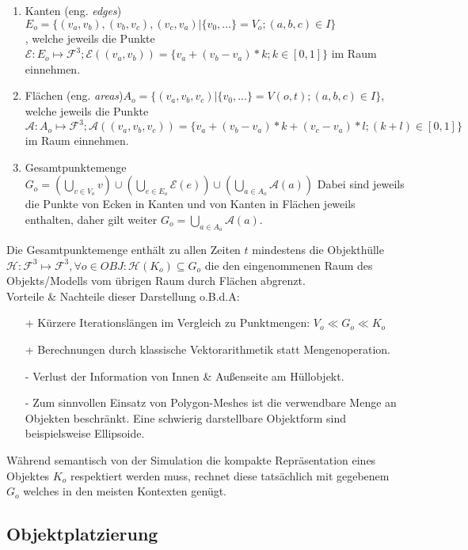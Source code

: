 \begin{enumerate}
\item Kanten (eng. \textit{edges}) $E_o = \{(v_a, v_b), (v_b, v_c),(v_c, v_a) | \{v_0, ...\} = V_o;(a, b, c) \in I\} $\\
, welche jeweils die Punkte $\mathcal{E}:E_o\mapsto\mathcal{F}^3; \mathcal{E}((v_a, v_b)) = \{v_a + (v_b-v_a)* k; k \in [0,1]\} $ im Raum einnehmen.
\item Flächen (eng. \textit{areas})$ A_o = \{(v_a, v_b, v_c) | \{v_0, ... \} = V(o, t); (a, b, c) \in I\} $,\\
welche jeweils die Punkte $\mathcal{A}:A_o\mapsto\mathcal{F}^3; \mathcal{A}((v_a, v_b, v_c)) = \{v_a + (v_b-v_a)* k + (v_c-v_a)*l; (k+l) \in [0,1]\} $ im Raum einnehmen.
\item Gesamtpunktemenge $G_o = (\bigcup_{v\in V_o} v) \cup (\bigcup_{e\in E_o} \mathcal{E}(e)) \cup (\bigcup_{a\in A_o} \mathcal{A}(a)) $ Dabei sind jeweils die Punkte von Ecken in Kanten und von Kanten in Flächen jeweils enthalten, daher gilt weiter $G_o = \bigcup_{a\in A_o} \mathcal{A}(a)$.
\end{enumerate}
Die Gesamtpunktemenge enthält zu allen Zeiten $t$ mindestens die Objekthülle $\mathcal{H}: \mathcal{F}^3 \mapsto \mathcal{F}^3, \forall o\in OBJ: \mathcal{H}(K_o) \subseteq G_o$ die den eingenommenen Raum des Objekts/Modells vom übrigen Raum durch Flächen abgrenzt.\\


Vorteile \& Nachteile dieser Darstellung o.B.d.A:
\begin{itemize}
\item [+]Kürzere Iterationslängen im Vergleich zu Punktmengen: $V_o \ll G_o \ll K_o$
\item [+]Berechnungen durch klassische Vektorarithmetik statt Mengenoperation.
\item [-]Verlust der Information von Innen \& Außenseite am Hüllobjekt.
\item [-]Zum sinnvollen Einsatz von Polygon-Meshes ist die verwendbare Menge an Objekten beschränkt. Eine schwierig darstellbare Objektform sind beispielsweise Ellipsoide.
\end{itemize}

Während semantisch von der Simulation die kompakte Repräsentation eines Objektes $K_o$ respektiert werden muss, rechnet diese tatsächlich mit gegebenem $G_o$ welches in den meisten Kontexten genügt.

\subsection{Objektplatzierung}
\label{sec:objects_sim}

